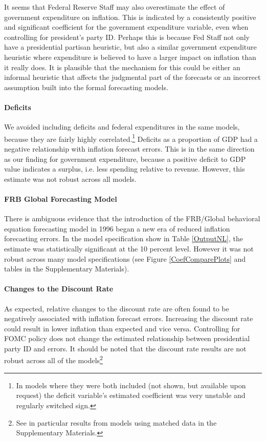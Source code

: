 \documentclass[a4paper]{article}
\begin{document}
It seems that Federal Reserve Staff may also overestimate the effect of government expenditure on inflation. This is indicated by a consistently positive and significant coefficient for the government expenditure variable, even when controlling for president's party ID. Perhaps this is because Fed Staff not only have a presidential partisan heuristic, but also a similar government expenditure heuristic where expenditure is believed to have a larger impact on inflation than it really does. It is plausible that the mechanism for this could be either an informal heuristic that affects the judgmental part of the forecasts or an incorrect assumption built into the formal forecasting models.

\paragraph{Deficits} We avoided including deficits and federal expenditures in the same models, because they are fairly highly correlated.\footnote{In models where they were both included (not shown, but available upon request) the deficit variable's estimated coefficient was very unstable and regularly switched sign.} Deficits as a proportion of GDP had a negative relationship with inflation forecast errors. This is in the same direction as our finding for government expenditure, because a positive deficit to GDP value indicates a surplus, i.e. less spending relative to revenue. However, this estimate was not robust across all models.

\paragraph{FRB Global Forecasting Model}

There is ambiguous evidence that the introduction of the FRB/Global behavioral equation forecasting model in 1996 began a new era of reduced inflation forecasting errors. In the model specification show in Table \ref{OutputNL}, the estimate was statistically significant at the 10 percent level. However it was not robust across many model specifications (see Figure \ref{CoefComparePlots} and tables in the Supplementary Materials).

\paragraph{Changes to the Discount Rate}

As expected, relative changes to the discount rate are often found to be negatively associated with inflation forecast errors. Increasing the discount rate could result in lower inflation than expected and vice versa. Controlling for FOMC policy does not change the estimated relationship between presidential party ID and errors. It should be noted that the discount rate results are not robust across all of the models\footnote{See in particular results from models using matched data in the Supplementary Materials.}
\end{document}
